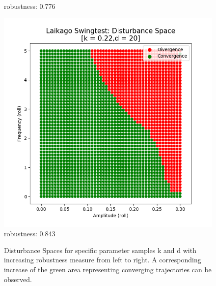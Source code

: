 \begin{figure}[h!]
\begin{minipage}{0.33\textwidth}
            \small robustness: 0.776 %
        \end{minipage}
        \begin{minipage}{0.33\textwidth}
            \centering
            \includegraphics[width=\textwidth]{figures/swingtest_ds_opt_vfinal.png} \\
            \small robustness: 0.843 %
        \end{minipage}

    \caption[Disturbance Spaces for Selected Parameter Sets, Drop Test]{Disturbance Spaces for specific parameter samples k and d with increasing robustness measure from left to right. A corresponding increase of the green area representing converging trajectories can be observed.}
    \label{fig:swingds}
    \end{figure}



